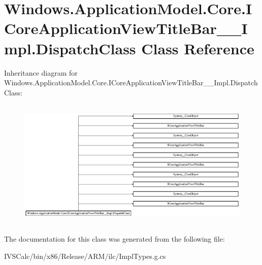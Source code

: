 \hypertarget{class_windows_1_1_application_model_1_1_core_1_1_i_core_application_view_title_bar_____impl_1_1_dispatch_class}{}\section{Windows.\+Application\+Model.\+Core.\+I\+Core\+Application\+View\+Title\+Bar\+\_\+\+\_\+\+Impl.\+Dispatch\+Class Class Reference}
\label{class_windows_1_1_application_model_1_1_core_1_1_i_core_application_view_title_bar_____impl_1_1_dispatch_class}
Inheritance diagram for Windows.\+Application\+Model.\+Core.\+I\+Core\+Application\+View\+Title\+Bar\+\_\+\+\_\+\+Impl.\+Dispatch\+Class\+:\begin{figure}[H]
\begin{center}
\leavevmode
\includegraphics[height=6.247465cm]{class_windows_1_1_application_model_1_1_core_1_1_i_core_application_view_title_bar_____impl_1_1_dispatch_class}
\end{center}
\end{figure}


The documentation for this class was generated from the following file\+:\begin{DoxyCompactItemize}
\item 
I\+V\+S\+Calc/bin/x86/\+Release/\+A\+R\+M/ilc/Impl\+Types.\+g.\+cs\end{DoxyCompactItemize}
